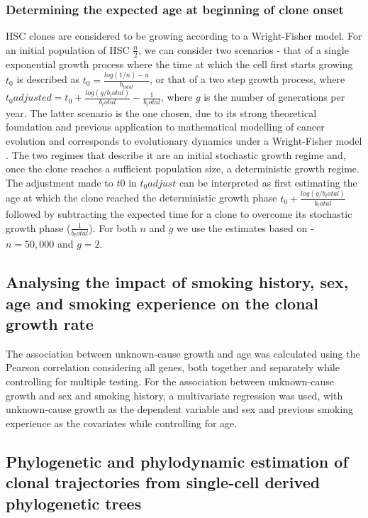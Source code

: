 \subsubsection{Determining the expected age at beginning of clone onset}

HSC clones are considered to be growing according to a Wright-Fisher model. For an initial population of HSC $\frac{n}{2}$, we can consider two scenarios - that of a single exponential growth process where the time at which the cell first starts growing $t_0$ is described as $t_0 = \frac{log(1/n) - u}{b_{total}}$, or that of a two step growth process, where $t_{0}adjusted=t_0 + \frac{log(g/b_total)}{b_total}-\frac{1}{b_total}$, where $g$ is the number of generations per year. The latter scenario is the one chosen, due to its strong theoretical foundation and previous application to mathematical modelling of cancer evolution and corresponds to evolutionary dynamics under a Wright-Fisher model \cite{Beerenwinkel2015-xr}. The two regimes that describe it are an initial stochastic growth regime and, once the clone reaches a sufficient population size, a deterministic growth regime. The adjustment made to $t0$ in $t_0adjust$ can be interpreted as first estimating the age at which the clone reached the deterministic growth phase $t_0 + \frac{log(g/b_total)}{b_total}$ followed by subtracting the expected time for a clone to overcome its stochastic growth phase ($\frac{1}{b_total}$). For both $n$ and $g$ we use the estimates based on \cite{Lee-Six2018-lp} - $n=50,000$ and $g=2$. 

\subsection{Analysing the impact of smoking history, sex, age and smoking experience on the clonal growth rate}

The association between unknown-cause growth and age was calculated using the Pearson correlation considering all genes, both together and separately while controlling for multiple testing. For the association between unknown-cause growth and sex and smoking history, a multivariate regression was used, with unknown-cause growth as the dependent variable and sex and previous smoking experience as the covariates while controlling for age.

\subsection{Phylogenetic and phylodynamic estimation of clonal trajectories from single-cell derived phylogenetic trees}

